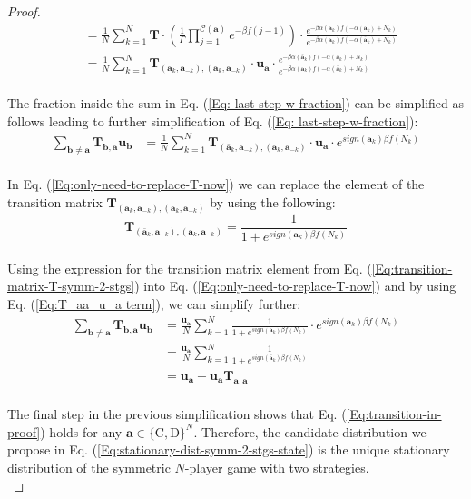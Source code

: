 \documentclass[11pt]{article}
\theoremstyle{plainCl1}
\theoremstyle{plainCl2}
\newcommand{\abf}{\mathbf{a}}
\newcommand{\bbf}{\mathbf{b}}
\newcommand{\T}{\mathbf{T}}
\newcommand{\ubf}{\mathbf{u}}
\newcommand{\C}{\mathrm{C}}
\newcommand{\D}{\mathrm{D}}
\begin{document}
\begin{proof}
\begin{align}
&= \frac{1}{N} \sum_{k=1}^N  \T \cdot \left( \frac{1}{\Gamma} \prod_{j=1}^{\mathcal{C}(\abf)} e^{-\beta f(j-1)}\right) \cdot \frac{e^{-\beta \alpha(\bar{\abf}_k)f(-\alpha(\abf_k)+ N_k)}}{e^{-\beta \alpha(\abf_k)f(-\alpha(\bar{\abf}_k) +N_k)}} \\[10pt]
&= \frac{1}{N} \sum_{k=1}^N  \T_{(\bar{\abf}_k, \abf_{-k}),(\abf_k, \abf_{-k})} \cdot \ubf_\abf \cdot \frac{e^{-\beta \alpha(\bar{\abf}_k)f(-\alpha(\abf_k)+ N_k)}}{e^{-\beta \alpha(\abf_k)f(-\alpha(\bar{\abf}_k) +N_k)}} \label{Eq: last-step-w-fraction} 
\end{align}
\\ \noindent The fraction inside the sum in  Eq. (\ref{Eq: last-step-w-fraction}) can be simplified as follows leading to further simplification of Eq. (\ref{Eq: last-step-w-fraction}):
\begin{align}
\sum_{\bbf \neq \abf} \T_{\bbf, \abf} \ubf_{\bbf} &= \frac{1}{N} \sum_{k=1}^N  \T_{(\bar{\abf}_k, \abf_{-k}),(\abf_k, \abf_{-k})} \cdot \ubf_\abf \cdot e^{sign(\abf_k) \beta f(N_k)} 
\label{Eq:only-need-to-replace-T-now}
\end{align}
\\ \noindent In Eq. (\ref{Eq:only-need-to-replace-T-now}) we can replace the element of the transition matrix $\T_{(\bar{\abf}_k, \abf_{-k}),(\abf_k, \abf_{-k})}$ by using the following: 
\begin{equation}
\T_{(\bar{\abf}_k, \abf_{-k}),(\abf_k, \abf_{-k})} = \frac{1}{1 + \displaystyle e^{\mathit{sign}(\abf_k) \beta f(N_k)}} 
\label{Eq:transition-matrix-T-symm-2-stgs}
\end{equation}
\\ \noindent Using the expression for the transition matrix element from Eq. (\ref{Eq:transition-matrix-T-symm-2-stgs}) into Eq. (\ref{Eq:only-need-to-replace-T-now}) and by using Eq. (\ref{Eq:T_aa_u_a term}), we can simplify further: 
\begin{align}
\sum_{\bbf \neq \abf} \T_{\bbf, \abf} \ubf_{\bbf} &= \frac{\ubf_\abf}{N} \sum_{k=1}^N \frac{1}{1 + \displaystyle e^{\mathit{sign}(\abf_k) \beta f(N_k)}} \cdot  e^{sign(\abf_k) \beta f(N_k)} \\[10pt]
&= \frac{\ubf_\abf}{N} \sum_{k=1}^N \frac{1}{1 + \displaystyle e^{\mathit{sign}(\bar{\abf}_k) \beta f(N_k)}}  \\[10pt]
&= \ubf_\abf - \ubf_\abf \T_{\abf,\abf}
\end{align}
\\ \noindent The final step in the previous simplification shows that Eq. (\ref{Eq:transition-in-proof}) holds for any $\abf \in \{\C,\D\}^N$. Therefore, the candidate distribution we propose in Eq. (\ref{Eq:stationary-dist-symm-2-stgs-state}) is the unique stationary distribution of the symmetric $N$-player game with two strategies. \\
\end{proof}
\end{document}
